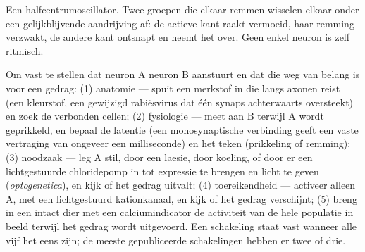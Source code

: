 \begin{omfigure}

{\small Een halfcentrumoscillator. Twee groepen die elkaar remmen
wisselen elkaar onder een gelijkblijvende aandrijving af: de actieve
kant raakt vermoeid, haar remming verzwakt, de andere kant ontsnapt en
neemt het over. Geen enkel neuron is zelf ritmisch.}
\end{omfigure}

\begin{method}\label{met:b3:nervous-systems:tracing}
Om vast te stellen dat neuron A neuron B aanstuurt en dat die weg van
belang is voor een gedrag: (1) anatomie --- spuit een merkstof in die
langs axonen reist (een kleurstof, een gewijzigd rabiësvirus dat één
synaps achterwaarts oversteekt) en zoek de verbonden cellen;
(2) fysiologie --- meet aan B terwijl A wordt geprikkeld, en bepaal de
latentie (een monosynaptische verbinding geeft een vaste vertraging van
ongeveer een milliseconde) en het teken (prikkeling of remming);
(3) noodzaak --- leg A stil, door een laesie, door koeling, of door er
een lichtgestuurde chloridepomp in tot expressie te brengen en licht te
geven (\emph{optogenetica}), en kijk of het gedrag uitvalt;
(4) toereikendheid --- activeer alleen A, met een lichtgestuurd
kationkanaal, en kijk of het gedrag verschijnt; (5) breng in een intact
dier met een calciumindicator de activiteit van de hele populatie in
beeld terwijl het gedrag wordt uitgevoerd. Een schakeling staat vast
wanneer alle vijf het eens zijn; de meeste gepubliceerde schakelingen
hebben er twee of drie.
\end{method}


